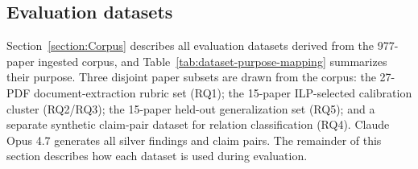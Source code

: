 \subsection{Evaluation datasets}\label{subsec:eval-datasets}

Section~\ref{section:Corpus} describes all evaluation datasets derived from the 977-paper ingested corpus, and Table~\ref{tab:dataset-purpose-mapping} summarizes their purpose. Three disjoint paper subsets are drawn from the corpus: the 27-PDF document-extraction rubric set (RQ1); the 15-paper ILP-selected calibration cluster (RQ2/RQ3); the 15-paper held-out generalization set (RQ5); and a separate synthetic claim-pair dataset for relation classification (RQ4). Claude Opus 4.7 generates all silver findings and claim pairs. The remainder of this section describes how each dataset is used during evaluation.